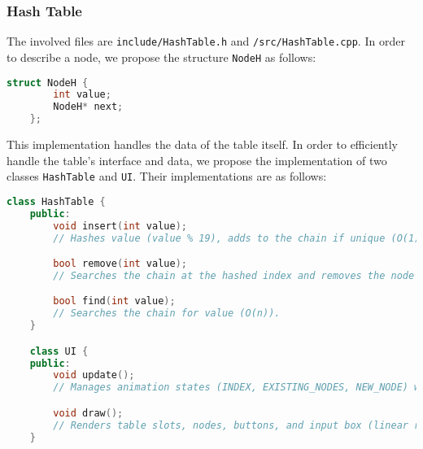 \documentclass{article}
\begin{document}
\subsubsection{Hash Table}
The involved files are \lstinline|include/HashTable.h| and \lstinline|/src/HashTable.cpp|. In order to describe a node, we propose the structure \lstinline|NodeH| as follows:
\begin{lstlisting}[language=c++]
	struct NodeH {
		int value;
		NodeH* next;
	};
\end{lstlisting}
This implementation handles the data of the table itself. In order to efficiently handle the table's interface and data, we propose the implementation of two classes \lstinline|HashTable| and \lstinline|UI|. Their implementations are as follows:
\begin{lstlisting}[language=c++]
	class HashTable {
	public:
		void insert(int value);
		// Hashes value (value % 19), adds to the chain if unique (O(1) on average, worst case O(n)).

		bool remove(int value);
		// Searches the chain at the hashed index and removes the node (O(n)).

		bool find(int value);
		// Searches the chain for value (O(n)).
	}

	class UI {
	public:
		void update();
		// Manages animation states (INDEX, EXISTING_NODES, NEW_NODE) with a timer, processes user input, and queues file-loaded values.

		void draw();
		// Renders table slots, nodes, buttons, and input box (linear rendering O(n)).
	}
\end{lstlisting}
\end{document}
